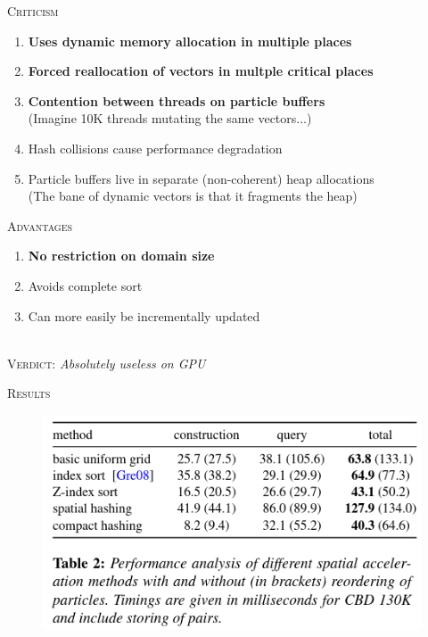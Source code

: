 \documentclass[14pt]{beamer}
\begin{document}
\begin{frame}
\centering
{
\begin{minipage}[c][.7\textheight][t]{.9\textwidth}
\centering
\scriptsize
\textsc{Criticism}\\[.3em]

\raggedright
\begin{enumerate}
\item \textbf{Uses dynamic memory allocation in multiple
places}
\item \textbf{Forced reallocation of vectors in multple
critical places}
\item \textbf{Contention between threads on particle
buffers}\\
    {\color{gray}(Imagine 10K threads mutating the same
    vectors...)}

\item Hash collisions cause performance degradation
\item Particle buffers live in separate (non-coherent) heap
allocations \\
    {\color{gray}(The bane of dynamic vectors is that it
    fragments the heap)}
\end{enumerate}

\pause
\centering
\vspace{1em}
\textsc{Advantages}\\[.3em]

\raggedright
\begin{enumerate}
\item \textbf{No restriction on domain size}
\item Avoids complete sort
\item Can more easily be incrementally updated
\end{enumerate}

\vfill
\centering
{\normalsize
{}}\\[.3em]
\textsc{Verdict:} {\em Absolutely useless on GPU}
\end{minipage}
}
\end{frame}

\begin{frame}
\centering
{
\begin{minipage}[c][.7\textheight][t]{.9\textwidth}
\centering
\scriptsize
\textsc{Results}\\[.3em]
\begin{figure}
\includegraphics[width=.7\textwidth]{paper-results}
\end{figure}

\end{minipage}
}
\end{frame}
\end{document}
